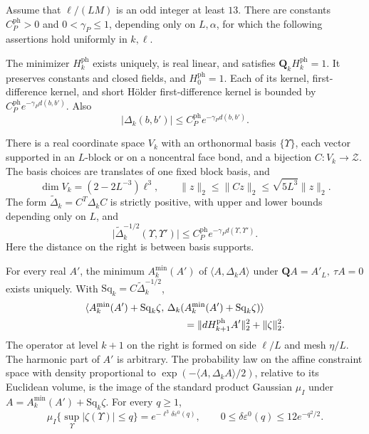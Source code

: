 \begin{theorem}\label{thm:maxwell-block}
Assume that \(\ell/(LM)\) is an odd integer at least \(13\).
There are constants \(C_P^{\mathrm{ph}}>0\) and
\(0<\gamma_P\le1\), depending only on \(L,\alpha\), for which
the following assertions hold uniformly in \(k,\ell\).

The minimizer \(H_k^{\mathrm{ph}}\) exists uniquely, is real
linear, and satisfies \(\mathbf Q_kH_k^{\mathrm{ph}}=1\).
It preserves constants and closed fields, and \(H_0^{\mathrm{ph}}=1\).
Each of its kernel, first-difference kernel, and short H\"older
first-difference kernel is bounded by
\(C_P^{\mathrm{ph}}e^{-\gamma_Pd(b,b')}\).
Also
\[
 |\Delta_k(b,b')|\le C_P^{\mathrm{ph}}e^{-\gamma_Pd(b,b')}.
\]

There is a real coordinate space \(V_k\) with an orthonormal
basis \(\{\Upsilon\}\), each vector supported in an \(L\)-block
or on a noncentral face bond, and a bijection \(C:V_k\to\mathcal Z\).
The basis choices are translates of one fixed block basis, and
\[
 \dim V_k=(2-2L^{-3})\ell^3,\qquad
 \|z\|_2\le\|Cz\|_2\le\sqrt{5L^3}\|z\|_2.
\]
The form \(\widetilde\Delta_k=C^T\Delta_kC\) is strictly positive,
with upper and lower bounds depending only on \(L\), and
\[
 \big|\widetilde\Delta_k^{-1/2}(\Upsilon,\Upsilon')\big|
 \le C_P^{\mathrm{ph}}e^{-\gamma_Pd(\Upsilon,\Upsilon')}.
\]
Here the distance on the right is between basis supports.

For every real \(A'\), the minimum \(A_k^{\min}(A')\) of
\(\langle A,\Delta_kA\rangle\) under
\(\mathbf QA=A'_L,\ \tau A=0\) exists uniquely. With
\(\mathrm{Sq}_k=C\widetilde\Delta_k^{-1/2}\),
\begin{equation}\label{eq:main-block-split}
 \begin{split}
 &\langle A_k^{\min}(A')+\mathrm{Sq}_k\zeta,\,
   \Delta_k(A_k^{\min}(A')+\mathrm{Sq}_k\zeta)\rangle\\
 &\hspace{35mm}=\|dH_{k+1}^{\mathrm{ph}}A'\|_2^2+\|\zeta\|_2^2.
 \end{split}
\end{equation}
The operator at level \(k+1\) on the right is formed on side
\(\ell/L\) and mesh \(\eta/L\). The harmonic part of \(A'\)
is arbitrary. The probability law on the affine constraint space
with density proportional to
\(\exp(-\langle A,\Delta_kA\rangle/2)\), relative to its Euclidean
volume, is the image of the standard product Gaussian \(\mu_I\)
under \(A=A_k^{\min}(A')+\mathrm{Sq}_k\zeta\).
For every \(q\ge1\),
\[
 \mu_I\{\sup_\Upsilon|\zeta(\Upsilon)|\le q\}
   =e^{-\ell^3\delta\varepsilon^0(q)},\qquad
 0\le\delta\varepsilon^0(q)\le12e^{-q^2/2}.
\]


\end{theorem}
